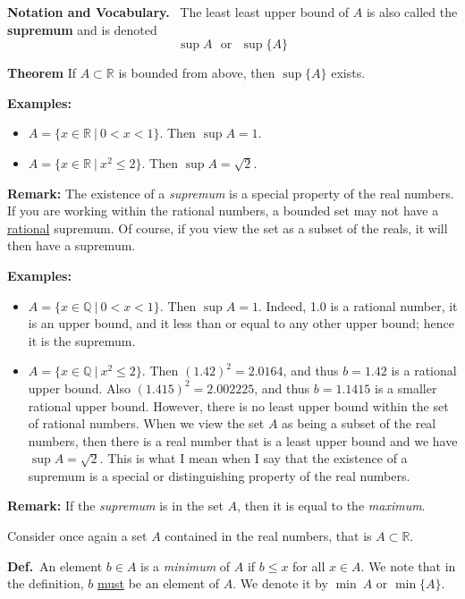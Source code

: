 \documentclass[letterpaper]{article}
\newcommand{\real}{\mathbb R}  %
\begin{document}
\textbf{Notation and Vocabulary.}~ The least least upper bound of $A$ is also called the \textbf{supremum} and is denoted
$$\sup A~~~\mbox{or}~~~\sup\{A\}$$

\newpage

\noindent \textbf{Theorem} If $A \subset \real$ is bounded from above, then $\sup\{A\}$ exists.

\noindent \textbf{Examples:}
\vspace*{-.2in}
\begin{itemize}
\item $A = \{  x\in \real~|~ 0  < x < 1\}$. Then $\sup A =1$.
\item $A= \{ x\in \real~|~ x^2 \le 2\}.$ Then  $\sup A =\sqrt{2}$.
\end{itemize}

\noindent \textbf{Remark:} The existence of a \textit{supremum} is a special property of the real numbers. If you are working within the rational numbers, a bounded set may not have a \underline{rational} supremum. Of course, if you view the set as a subset of the reals, it will then have a supremum.

\noindent \textbf{Examples:}
\vspace*{-.2in}
\begin{itemize}
\item $A = \{  x\in \mathbb{Q}~|~ 0  < x < 1\}$. Then $\sup A =1$. Indeed, 1.0 is a rational number, it is an upper bound, and it less than or equal to any other upper bound; hence it is the supremum.
\item $A= \{ x\in \mathbb{Q}~|~ x^2 \le 2\}.$  Then $(1.42)^2 = 2.0164$, and thus $b=1.42$ is a rational upper bound. Also $(1.415)^2 = 2.002225$, and thus $b=1.1415$ is a smaller rational upper bound. However, there is no least upper bound within the set of rational numbers. When we view the set $A$ as being a subset of the real numbers, then there is a real number that is a least upper bound and we have $\sup A =\sqrt{2}$. This is what I mean when I say that the existence of a supremum is a special or distinguishing property of the real numbers.
\end{itemize}

\noindent \textbf{Remark:} If the \textit{supremum} is in the set $A$, then it is equal to the \textit{maximum}.

\newpage

Consider once again a set $A$ contained in the real numbers, that is $A \subset \real$.

\noindent \textbf{Def.}~An element $b\in A$ is a \textit{minimum} of $A$ if $b \le x$ for all  $x\in A$.
We note that in the definition,  $b$ \underline{must} be an element of $A$. We denote it by $\min~A$ or $\min \{ A\}$.
\end{document}

